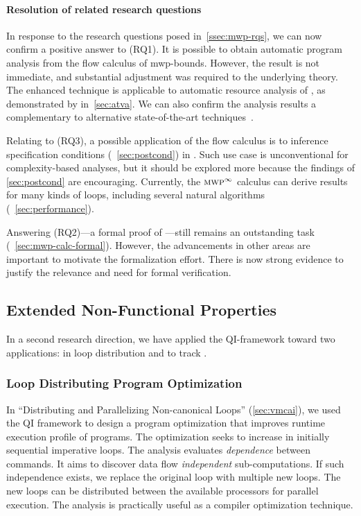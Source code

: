 \paragraph*{Resolution of related research questions}
In response to the research questions posed in~\autoref{ssec:mwp-rqs}, we can
now confirm a positive answer to (RQ1). It is possible to obtain automatic
program analysis from the flow calculus of mwp-bounds.
However, the result is not immediate, and substantial adjustment was required to
the underlying theory. The enhanced technique is applicable to automatic
resource analysis of , as demonstrated by 
in~\autoref{sec:atva}. We can also confirm the analysis results a complementary
to alternative state-of-the-art techniques~\cite[p. 5]{aubert2023b}.

Relating to (RQ3), a possible application of the flow calculus is to inference
specification conditions (\cf~\autoref{sec:postcond}) in
. Such use case is unconventional for complexity-based
analyses, but it should be explored more because the findings of
\autoref{sec:postcond} are encouraging. Currently, the
\(\textnormal{\textsc{mwp}}^\infty\) calculus can derive results for many kinds of
loops, including several natural algorithms (\cf~\autoref{sec:performance}).

Answering (RQ2)---a formal proof of ---still remains an
outstanding task (\cf~\autoref{sec:mwp-calc-formal}). However, the advancements
in other areas are important to motivate the formalization effort. There is now
strong evidence to justify the relevance and need for formal verification.

\subsection{Extended Non-Functional Properties}
\label{subsec:res-qi}

In a second research direction, we have applied the QI-framework toward two
applications: in loop distribution and
to track .

\subsubsection{Loop Distributing Program Optimization}
\label{subsubsec:qi-opt}

In \enquote{Distributing and Parallelizing Non-canonical Loops}
(\autoref{sec:vmcai}), we used the QI framework to design a program optimization
that improves runtime execution profile of programs. The optimization seeks to
increase  in initially sequential imperative
loops. The analysis evaluates \emph{dependence}
between commands. It aims to discover data flow \emph{independent}
sub-computations. If such independence exists, we
replace the original loop with multiple new loops. The new loops can be
distributed between the available
processors for parallel execution. The analysis is practically useful as a
compiler optimization technique.

